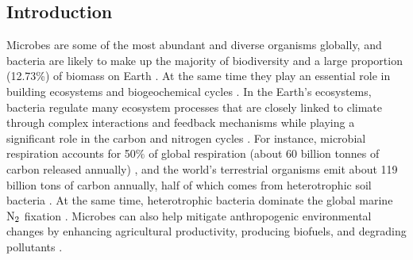 \documentclass[11pt, a4paper]{article}
\begin{document}
\begin{spacing}{1.5}
\clearpage

\tableofcontents 
\clearpage

\linenumbers
\renewcommand\thesection{\arabic{section}}
\section{Introduction}

Microbes are some of the most abundant and diverse organisms globally, and bacteria are likely to make up the majority of biodiversity and a large proportion (12.73\%) of biomass on Earth \citep{bar2018biomass}. At the same time they play an essential role in building ecosystems and biogeochemical cycles \citep{azam1998microbial}. In the Earth's ecosystems, bacteria regulate many ecosystem processes that are closely linked to climate through complex interactions and feedback mechanisms \citep{azam2007microbial, falkowski2008microbial} while playing a significant role in the carbon \citep{singh2010microorganisms} and nitrogen cycles \citep{kuypers2018microbial}. For instance, microbial respiration accounts for 50$\%$ of global respiration (about 60 billion tonnes of carbon released annually) \citep{hutchins2019climate}, and the world's terrestrial organisms emit about 119 billion tons of carbon annually, half of which comes from heterotrophic soil bacteria \citep{reay2007greenhouse}. At the same time, heterotrophic bacteria dominate the global marine ${\rm N_{2}}$ fixation \citep{halm2012heterotrophic}. Microbes can also help mitigate anthropogenic environmental changes by enhancing agricultural productivity, producing biofuels, and degrading pollutants \citep{cavicchioli2019scientists}. 


\end{spacing}
\end{document}
